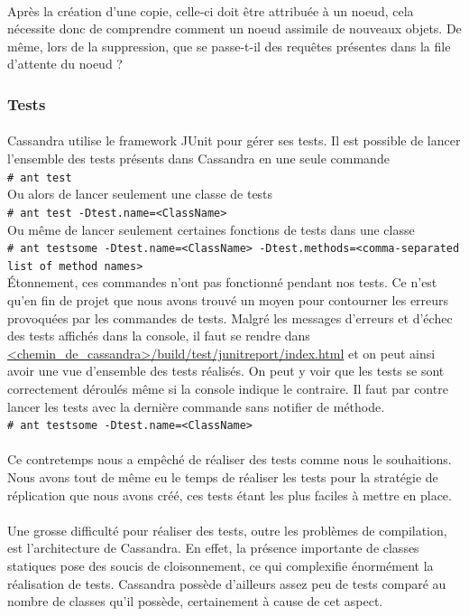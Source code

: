 \documentclass[12pt]{article}
\newcommand{\shellcmd}[1]{\\\indent\indent\texttt{\footnotesize\# #1}\\}
\begin{document}
\paragraph{}Après la création d'une copie, celle-ci doit être attribuée à un noeud, cela nécessite donc de comprendre comment un noeud assimile de nouveaux objets. De même, lors de la suppression, que se passe-t-il des requêtes présentes dans la file d'attente du noeud ?

\subsubsection{Tests}

\paragraph{}Cassandra utilise le framework JUnit pour gérer ses tests. Il est possible de lancer l'ensemble des tests présents dans Cassandra en une seule commande
\shellcmd{ant test}

Ou alors de lancer seulement une classe de tests
\shellcmd{ant test -Dtest.name=<ClassName>}

Ou même de lancer seulement certaines fonctions de tests dans une classe
\shellcmd{ant testsome -Dtest.name=<ClassName> -Dtest.methods=<comma-separated list of method names>}

Étonnement, ces commandes n'ont pas fonctionné pendant nos tests. Ce n'est qu'en fin de projet que nous avons trouvé un moyen pour contourner les erreurs provoquées par les commandes de tests. Malgré les messages d'erreurs et d'échec des tests affichés dans la console, il faut se rendre dans \url{<chemin\_de\_cassandra>/build/test/junitreport/index.html} et on peut ainsi avoir une vue d'ensemble des tests réalisés. On peut y voir que les tests se sont correctement déroulés même si la console indique le contraire. Il faut par contre lancer les tests avec la dernière commande sans notifier de méthode.
\shellcmd{ant testsome -Dtest.name=<ClassName>}

\paragraph{}Ce contretemps nous a empêché de réaliser des tests comme nous le souhaitions. Nous avons tout de même eu le temps de réaliser les tests pour la stratégie de réplication que nous avons créé, ces tests étant les plus faciles à mettre en place.

\paragraph{}Une grosse difficulté pour réaliser des tests, outre les problèmes de compilation, est l'architecture de Cassandra. En effet, la présence importante de classes statiques pose des soucis de cloisonnement, ce qui complexifie énormément la réalisation de tests. Cassandra possède d'ailleurs assez peu de tests comparé au nombre de classes qu'il possède, certainement à cause de cet aspect.
\end{document}
